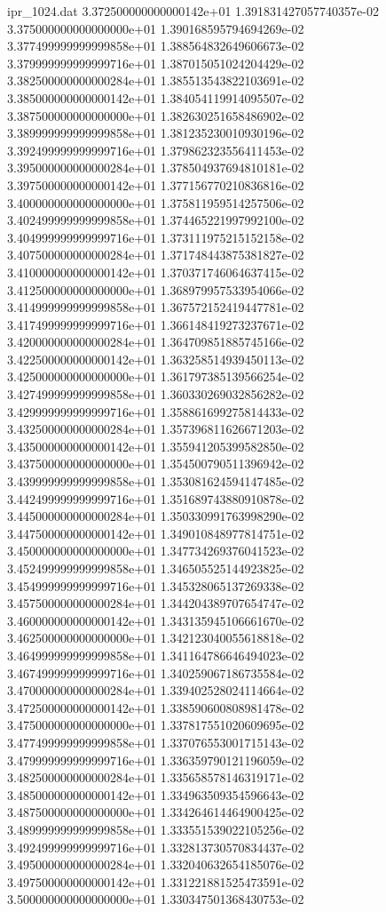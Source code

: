 \begin{filecontents}{ipr_1024.dat}
3.372500000000000142e+01 1.391831427057740357e-02
3.375000000000000000e+01 1.390168595794694269e-02
3.377499999999999858e+01 1.388564832649606673e-02
3.379999999999999716e+01 1.387015051024204429e-02
3.382500000000000284e+01 1.385513543822103691e-02
3.385000000000000142e+01 1.384054119914095507e-02
3.387500000000000000e+01 1.382630251658486902e-02
3.389999999999999858e+01 1.381235230010930196e-02
3.392499999999999716e+01 1.379862323556411453e-02
3.395000000000000284e+01 1.378504937694810181e-02
3.397500000000000142e+01 1.377156770210836816e-02
3.400000000000000000e+01 1.375811959514257506e-02
3.402499999999999858e+01 1.374465221997992100e-02
3.404999999999999716e+01 1.373111975215152158e-02
3.407500000000000284e+01 1.371748443875381827e-02
3.410000000000000142e+01 1.370371746064637415e-02
3.412500000000000000e+01 1.368979957533954066e-02
3.414999999999999858e+01 1.367572152419447781e-02
3.417499999999999716e+01 1.366148419273237671e-02
3.420000000000000284e+01 1.364709851885745166e-02
3.422500000000000142e+01 1.363258514939450113e-02
3.425000000000000000e+01 1.361797385139566254e-02
3.427499999999999858e+01 1.360330269032856282e-02
3.429999999999999716e+01 1.358861699275814433e-02
3.432500000000000284e+01 1.357396811626671203e-02
3.435000000000000142e+01 1.355941205399582850e-02
3.437500000000000000e+01 1.354500790511396942e-02
3.439999999999999858e+01 1.353081624594147485e-02
3.442499999999999716e+01 1.351689743880910878e-02
3.445000000000000284e+01 1.350330991763998290e-02
3.447500000000000142e+01 1.349010848977814751e-02
3.450000000000000000e+01 1.347734269376041523e-02
3.452499999999999858e+01 1.346505525144923825e-02
3.454999999999999716e+01 1.345328065137269338e-02
3.457500000000000284e+01 1.344204389707654747e-02
3.460000000000000142e+01 1.343135945106661670e-02
3.462500000000000000e+01 1.342123040055618818e-02
3.464999999999999858e+01 1.341164786646494023e-02
3.467499999999999716e+01 1.340259067186735584e-02
3.470000000000000284e+01 1.339402528024114664e-02
3.472500000000000142e+01 1.338590600808981478e-02
3.475000000000000000e+01 1.337817551020609695e-02
3.477499999999999858e+01 1.337076553001715143e-02
3.479999999999999716e+01 1.336359790121196059e-02
3.482500000000000284e+01 1.335658578146319171e-02
3.485000000000000142e+01 1.334963509354596643e-02
3.487500000000000000e+01 1.334264614464900425e-02
3.489999999999999858e+01 1.333551539022105256e-02
3.492499999999999716e+01 1.332813730570834437e-02
3.495000000000000284e+01 1.332040632654185076e-02
3.497500000000000142e+01 1.331221881525473591e-02
3.500000000000000000e+01 1.330347501368430753e-02

\end{filecontents}
